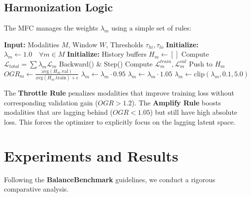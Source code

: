 \documentclass[10pt, twocolumn, letterpaper]{article}
\begin{document}
\subsection{Harmonization Logic}
The MFC manages the weights $\lambda_m$ using a simple set of rules:

\begin{algorithm}[h]
\caption{Modality Fairness Controller (MFC)}
\begin{algorithmic}[1]
\STATE \textbf{Input:} Modalities $M$, Window $W$, Thresholds $\tau_{hi}, \tau_{lo}$
\STATE \textbf{Initialize:} $\lambda_m \leftarrow 1.0 \quad \forall m \in M$
\STATE \textbf{Initialize:} History buffers $H_m \leftarrow []$
        \STATE Compute $\mathcal{L}_{total} = \sum \lambda_m \mathcal{L}_m$
        \STATE Backward() \& Step()
    \ENDFOR
        \STATE Compute $\mathcal{L}^{train}_m, \mathcal{L}^{val}_m$
        \STATE Push to $H_m$
            \STATE $OGR_m \leftarrow \frac{\text{avg}(H_m.\text{val})}{\text{avg}(H_m.\text{train}) + \epsilon}$
                \STATE $\lambda_m \leftarrow \lambda_m \cdot 0.95$ 
                \STATE $\lambda_m \leftarrow \lambda_m \cdot 1.05$ 
            \ENDIF
            \STATE $\lambda_m \leftarrow \text{clip}(\lambda_m, 0.1, 5.0)$
        \ENDIF
    \ENDFOR
\ENDFOR
\end{algorithmic}
\label{alg:mfc}
\end{algorithm}

The \textbf{Throttle Rule} penalizes modalities that improve training loss without corresponding validation gain ($OGR > 1.2$). The \textbf{Amplify Rule} boosts modalities that are lagging behind ($OGR < 1.05$) but still have high absolute loss. This forces the optimizer to explicitly focus on the lagging latent space.

\section{Experiments and Results}

Following the \textbf{BalanceBenchmark} guidelines, we conduct a rigorous comparative analysis.
\end{document}
